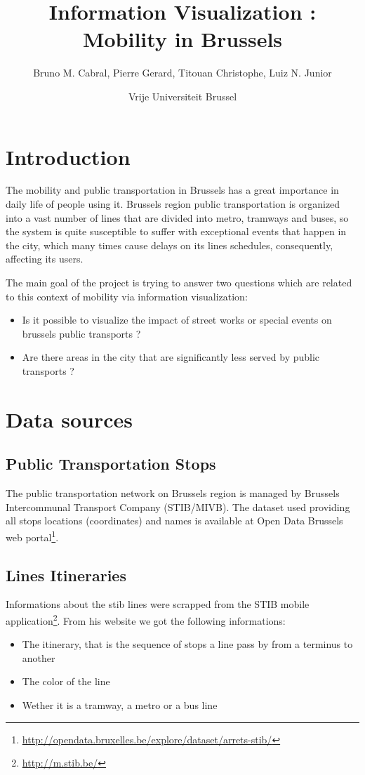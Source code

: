 \documentclass[11pt]{article}%
\begin{document}
\title{Information Visualization : Mobility in Brussels}
\author{Bruno M. Cabral, Pierre Gerard, Titouan Christophe, Luiz N. Junior}
\date{Vrije Universiteit Brussel}
\maketitle


\section{Introduction}
The mobility and public transportation in Brussels has a great importance in daily life of people using it.  Brussels region public transportation is organized into a vast number of lines that are divided into metro, tramways and buses, so the system is quite susceptible to suffer with exceptional events that happen in the city, which many times cause delays on its lines schedules, consequently, affecting its users.

The main goal of the project is trying to answer two questions which are related to this context of mobility via information visualization:

\begin{itemize}
	\item Is it possible to visualize the impact of street works or special events on brussels public transports ?
	\item Are there areas in the city that are significantly less served by public transports ?
\end{itemize}


\section{Data sources}
\subsection{Public Transportation Stops}
The public transportation network on Brussels region is managed by Brussels Intercommunal Transport Company (STIB/MIVB). The dataset used providing all stops locations (coordinates) and names is available at Open Data Brussels web portal\footnote{\url{http://opendata.bruxelles.be/explore/dataset/arrets-stib/}}.

\subsection{Lines Itineraries}
Informations about the stib lines were scrapped from the STIB mobile application\footnote{\url{http://m.stib.be/}}. From his website we got the following informations:
\begin{itemize}
    \item The itinerary, that is the sequence of stops a line pass by from a terminus to another
    \item The color of the line
    \item Wether it is a tramway, a metro or a bus line
\end{itemize}
\end{document}
